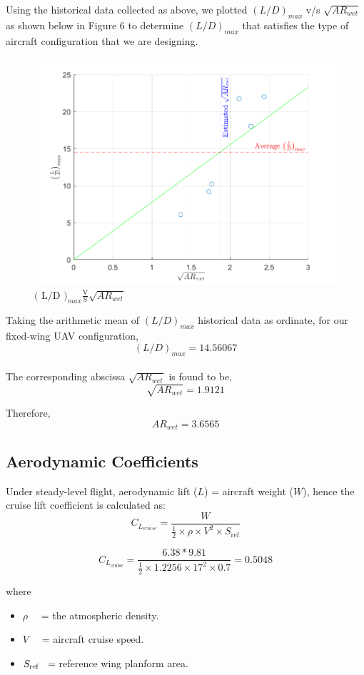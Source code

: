 \documentclass[12 pt]{article}
\begin{document}
Using the historical data collected as above, we plotted ${{(L/D)}_{max}}$ v/s $\sqrt{AR_{wet}}$ as shown below in Figure 6 to determine ${{(L/D)}_{max}}$ that satisfies the type of aircraft configuration that we are designing.
\newpage
\begin{figure}
    \centering
    \includegraphics[width=0.8\linewidth]{Codes/Week 3/AR_wergraph.png}
    \caption{{$\text{( L/D )}_{max} \frac{\text{V}}{\text{S}} \sqrt{AR_{wet}}$ }}
    \label{Data Collection}
\end{figure}

Taking the arithmetic mean of ${( L/D )}_{max}$ historical data as ordinate, for our fixed-wing UAV configuration, $${( L/D )}_{max} = 14.56067 $$\\

The corresponding abscissa $\sqrt{{AR}_{wet}}$ is found to be,\\

$$\sqrt{{AR}_{wet}} = 1.9121$$

Therefore, $${AR}_{wet} = 3.6565$$

\subsection{{Aerodynamic Coefficients}}
Under steady-level flight, aerodynamic lift ($L$) = aircraft weight ($W$), hence the cruise lift coefficient is calculated as:
\[
C_{L_{cruise}} = \frac{W}{\frac{1}{2} \times \rho \times V^2 \times S_{\text{ref}}}
\tag{3.2}\]

\[
C_{L_{\text{cruise}}} = \frac{6.38*9.81}{\frac{1}{2} \times 1.2256 \times 17^2 \times 0.7} = 0.5048
\]

where 
\begin{itemize}
  \item[] $\rho \quad$ = the atmospheric density.
  \item[] $V \quad$ = aircraft cruise speed.
  \item[] $S_{\text{ref} \hspace{0.5em}}$ = reference wing planform area.\\
\end{itemize}
\end{document}
